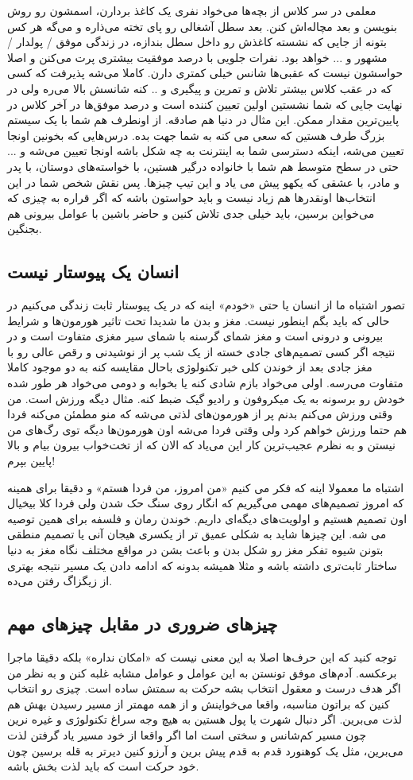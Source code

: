معلمی در سر کلاس از بچه‌ها می‌خواد نفری یک کاغذ بردارن، اسمشون رو روش بنویسن و بعد مچاله‌اش کنن. بعد سطل آشغالی رو پای تخته می‌ذاره و می‌گه هر کس بتونه از جایی که نشسته کاغذش رو داخل سطل بندازه، در زندگی موفق / پولدار / مشهور و ... خواهد بود. نفرات جلویی با درصد موفقیت بیشتری پرت می‌کنن و اصلا حواسشون نیست که عقبی‌ها شانس خیلی کمتری دارن. کاملا می‌شه پذیرفت که کسی که در عقب کلاس بیشتر تلاش و تمرین و پیگیری و .. کنه شانسش بالا می‌ره ولی در نهایت جایی که شما نشستین اولین تعیین کننده است و درصد موفق‌ها در آخر کلاس در پایین‌ترین مقدار ممکن.
این مثال در دنیا هم صادقه. از اونطرف هم شما با یک سیستم بزرگ طرف هستین که سعی می کنه به شما جهت بده. درس‌هایی که بخونین اونجا تعیین می‌شه، اینکه دسترسی شما به اینترنت به چه شکل باشه اونجا تعیین می‌شه و ... حتی در سطح متوسط هم شما با خانواده درگیر هستین، با خواسته‌های دوستان، با پدر و مادر، با عشقی که یکهو پیش می یاد و این تیپ چیزها. پس نقش شخص شما در این انتخاب‌ها اونقدرها هم زیاد نیست و باید حواستون باشه که اگر قراره به چیزی که می‌خواین برسین، باید خیلی جدی تلاش کنین و حاضر باشین با عوامل بیرونی هم بجنگین.
\subsection*{انسان یک پیوستار نیست}
تصور اشتباه ما از انسان یا حتی «خودم» اینه که در یک پیوستار ثابت زندگی می‌کنیم در حالی که باید بگم اینطور نیست. مغز و بدن ما شدیدا تحت تاثیر هورمون‌ها و شرایط بیرونی و درونی است و مغز شمای گرسنه با شمای سیر مغزی متفاوت است و در نتیجه اگر کسی تصمیم‌های جادی خسته از یک شب پر از نوشیدنی و رقص عالی رو با مغز جادی بعد از خوندن کلی خبر تکنولوژی باحال مقایسه کنه به دو موجود کاملا متفاوت می‌رسه. اولی می‌خواد بازم شادی کنه یا بخوابه و دومی می‌خواد هر طور شده خودش رو برسونه به یک میکروفون و رادیو گیک
ضبط کنه. مثال دیگه ورزش است. من وقتی ورزش می‌کنم بدنم پر از هورمون‌های لذتی می‌شه که منو مطمئن می‌کنه فردا هم حتما ورزش خواهم کرد ولی وقتی فردا می‌شه اون هورمون‌ها دیگه توی رگ‌های من نیستن و به نظرم عجیب‌ترین کار این می‌یاد که الان که از تخت‌خواب بیرون بیام و بالا پایین بپرم!

اشتباه ما معمولا اینه که فکر می کنیم «من امروز، من فردا هستم» و دقیقا برای همینه که امروز تصمیم‌های مهمی می‌گیریم که انگار روی سنگ حک شدن ولی فردا کلا بیخیال اون تصمیم هستیم و اولویت‌های دیگه‌ای داریم. خوندن رمان و فلسفه برای همین توصیه می شه. این چیزها شاید به شکلی عمیق تر از یکسری هیجان آنی یا تصمیم منطقی بتونن شیوه تفکر مغز رو شکل بدن و باعث بشن در مواقع مختلف نگاه مغز به دنیا ساختار ثابت‌تری داشته باشه و مثلا همیشه بدونه که ادامه دادن یک مسیر نتیجه بهتری از زیگزاگ رفتن می‌ده.
\subsection*{چیزهای ضروری در مقابل چیزهای مهم}
توجه کنید که این حرف‌ها اصلا به این معنی نیست که «امکان نداره» بلکه دقیقا ماجرا برعکسه. آدم‌های موفق تونستن به این عوامل و عوامل مشابه غلبه کنن و به نظر من اگر هدف درست و معقول انتخاب بشه حرکت به سمتش ساده است. چیزی رو انتخاب کنین که براتون مناسبه، واقعا می‌خواینش و از همه مهمتر از مسیر رسیدن بهش هم لذت می‌برین. اگر دنبال شهرت یا پول هستین به هیچ وجه سراغ تکنولوژی و غیره نرین چون مسیر کم‌شانس و سختی است اما اگر واقعا از خود مسیر یاد گرفتن لذت می‌برین، مثل یک کوهنورد قدم به قدم پیش برین و آرزو کنین دیرتر به قله برسین چون خود حرکت است که باید لذت بخش باشه.
